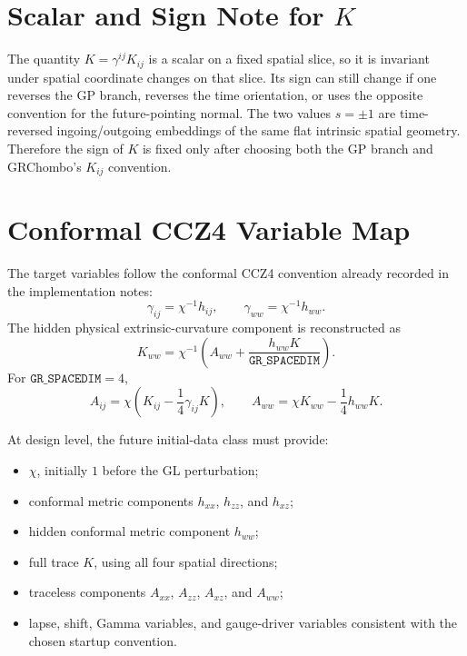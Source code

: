 \documentclass[11pt]{article}
\newcommand{\GRSP}{\texttt{GR\_SPACEDIM}}
\begin{document}
\section{Scalar and Sign Note for \(K\)}

The quantity \(K=\gamma^{ij}K_{ij}\) is a scalar on a fixed spatial slice, so
it is invariant under spatial coordinate changes on that slice. Its sign can
still change if one reverses the GP branch, reverses the time orientation, or
uses the opposite convention for the future-pointing normal. The two values
\(s=\pm 1\) are time-reversed ingoing/outgoing embeddings of the same flat
intrinsic spatial geometry. Therefore the sign of \(K\) is fixed only after
choosing both the GP branch and GRChombo's \(K_{ij}\) convention.

\section{Conformal CCZ4 Variable Map}

The target variables follow the conformal CCZ4 convention already recorded in
the implementation notes:
\begin{equation}
  \gamma_{ij} = \chi^{-1} h_{ij},
  \qquad
  \gamma_{ww} = \chi^{-1} h_{ww}.
  \label{eq:conformal-metric}
\end{equation}
The hidden physical extrinsic-curvature component is reconstructed as
\begin{equation}
  K_{ww}
  =
  \chi^{-1}
  \left(
    A_{ww} + \frac{h_{ww}K}{\GRSP}
  \right).
  \label{eq:kww-reconstruction}
\end{equation}
For \(\GRSP=4\),
\begin{equation}
  A_{ij}
  =
  \chi
  \left(
    K_{ij} - \frac{1}{4}\gamma_{ij}K
  \right),
  \qquad
  A_{ww}
  =
  \chi K_{ww} - \frac{1}{4}h_{ww}K .
  \label{eq:aij-map}
\end{equation}

At design level, the future initial-data class must provide:
\begin{itemize}
  \item \(\chi\), initially \(1\) before the GL perturbation;
  \item conformal metric components \(h_{xx}\), \(h_{zz}\), and \(h_{xz}\);
  \item hidden conformal metric component \(h_{ww}\);
  \item full trace \(K\), using all four spatial directions;
  \item traceless components \(A_{xx}\), \(A_{zz}\), \(A_{xz}\), and \(A_{ww}\);
  \item lapse, shift, Gamma variables, and gauge-driver variables consistent
    with the chosen startup convention.
\end{itemize}
\end{document}
